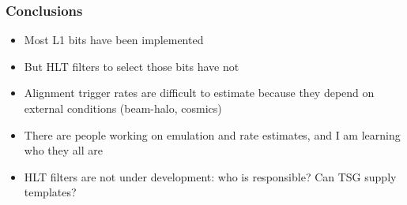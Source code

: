 \documentclass[compress]{beamer}
\begin{document}
\begin{frame}
\frametitle{Conclusions}
\begin{itemize}\setlength{\itemsep}{0.65 cm}
\item Most L1 bits have been implemented
\item But HLT filters to select those bits have not
\item Alignment trigger rates are difficult to estimate because they
depend on external conditions (beam-halo, cosmics)
\item There are people working on emulation and rate estimates, and I
am learning who they all are
\item HLT filters are not under development: who is responsible? Can TSG
supply templates?
\end{itemize}
\label{numpages}
\end{frame}
\end{document}
